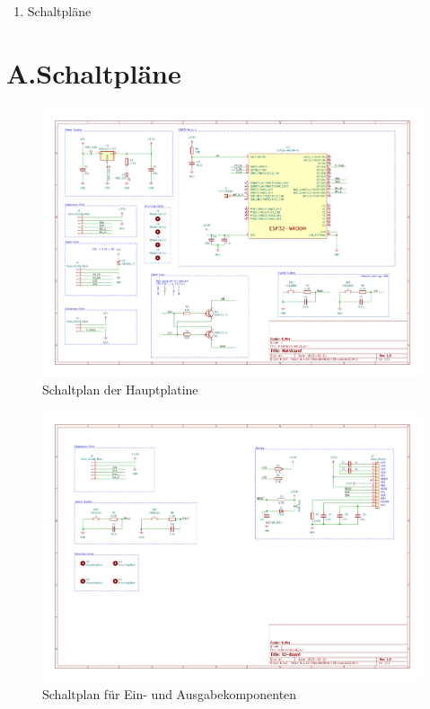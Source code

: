 
{\Large
\begin{enumerate}[label=\Alph*.]
	\item Schaltpläne
\end{enumerate}
}
\pagebreak
\section*{A.Schaltpläne}
\begin{figure}[htp]
    \centering
    \includegraphics[width=0.73\textheight,angle=90]{../PDFs/mainBoard.pdf}
    \caption{Schaltplan der Hauptplatine}
    \label{fig:mainPCB}
\end{figure}

\begin{figure}[htp]
    \centering
    \includegraphics[width=0.9\textheight,angle=90]{../PDFs/ioBoard.pdf}
    \caption{Schaltplan für Ein- und Ausgabekomponenten}
    \label{fig:ioPCB}
\end{figure}

